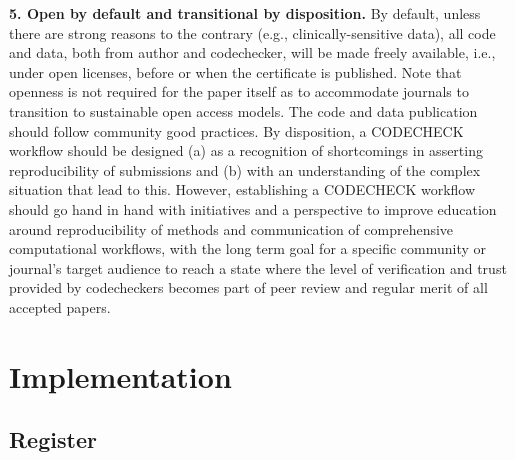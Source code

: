 \documentclass[12pt]{article}
\begin{document}
\textbf{5. Open by default and transitional by disposition.} %
By default, unless there are strong
reasons to the contrary (e.g., clinically-sensitive data), all code and
data, both from author and codechecker, will be made freely available, i.e., 
under open licenses, before or when the certificate is published.
Note that openness is not required for the paper itself as to accommodate 
journals to transition to sustainable open access models.
The code and data publication should follow community good practices.
By disposition, a CODECHECK workflow should be designed (a) as a recognition of
shortcomings in asserting reproducibility of submissions and (b)
with an understanding of the
complex situation that lead to this. However, establishing a CODECHECK workflow
should go hand in hand with initiatives and a perspective to improve education
around reproducibility of methods and communication of comprehensive 
computational workflows, with the long term goal for a specific community or
journal's target audience to reach a state where the level of verification 
and trust provided by codecheckers becomes part of peer review and regular
merit of all accepted papers.

\section*{Implementation}\label{implementation}

\subsection*{Register}\label{register}
\end{document}
